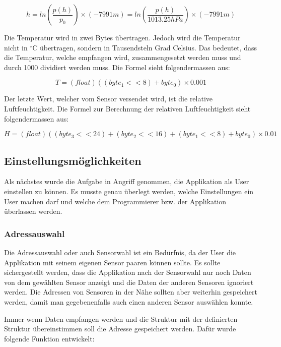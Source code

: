 \begin{equation}
	h = ln(\frac{p(h)}{p_0}) \times (-7991 m) = ln(\frac{p(h)}{1013.25 hPa}) \times (-7991 m)
\end{equation}

Die Temperatur wird in zwei Bytes übertragen. Jedoch wird die Temperatur nicht in $^\circ$C übertragen, sondern in Tausendsteln Grad Celsius. Das bedeutet, dass die Temperatur, welche empfangen wird, zusammengesetzt werden muss und durch 1000 dividiert werden muss. Die Formel sieht folgendermassen aus:

\begin{equation}
	T = (float)((byte_1 << 8) + byte_0) \times 0.001
\end{equation}

Der letzte Wert, welcher vom Sensor versendet wird, ist die relative Luftfeuchtigkeit. Die Formel zur Berechnung der relativen Luftfeuchtigkeit sieht folgendermassen aus:

\begin{equation}
	H = (float)((byte_3 << 24) + (byte_2 << 16) + (byte_1 << 8) + byte_0) \times 0.01
\end{equation}


\subsection{Einstellungsmöglichkeiten}

Als nächstes wurde die Aufgabe in Angriff genommen, die Applikation als User einstellen zu können. Es musste genau überlegt werden, welche Einstellungen ein User machen darf und welche dem Programmierer bzw. der Applikation überlassen werden.


\subsubsection{Adressauswahl}

Die Adressauswahl oder auch Sensorwahl ist ein Bedürfnis, da der User die Applikation mit seinem eigenen Sensor paaren können sollte. Es sollte sichergestellt werden, dass die Applikation nach der Sensorwahl nur noch Daten von dem gewählten Sensor anzeigt und die Daten der anderen Sensoren ignoriert werden. Die Adressen von Sensoren in der Nähe sollten aber weiterhin gespeichert werden, damit man gegebenenfalls auch einen anderen Sensor auswählen konnte.

Immer wenn Daten empfangen werden und die Struktur mit der definierten Struktur übereinstimmen soll die Adresse gespeichert werden. Dafür wurde folgende Funktion entwickelt:

